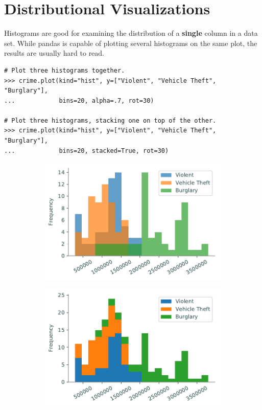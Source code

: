 \section*{Distributional Visualizations} %

Histograms are good for examining the distribution of a \textbf{single} column in a data set.
While pandas is capable of plotting several histograms on the same plot, the results are usually hard to read.

\begin{lstlisting}
# Plot three histograms together.
>>> crime.plot(kind="hist", y=["Violent", "Vehicle Theft", "Burglary"],
...            bins=20, alpha=.7, rot=30)

# Plot three histograms, stacking one on top of the other.
>>> crime.plot(kind="hist", y=["Violent", "Vehicle Theft", "Burglary"],
...            bins=20, stacked=True, rot=30)
\end{lstlisting}

\begin{figure}[H] %
\captionsetup[subfigure]{justification=centering}
\centering
\begin{subfigure}{.49\textwidth}
    \includegraphics[width=\textwidth]{figures/bad_hist_unstacked.pdf}
\end{subfigure}
%
\begin{subfigure}{.49\textwidth}
    \includegraphics[width=\textwidth]{figures/bad_hist_stacked.pdf}
\end{subfigure}
\end{figure}

